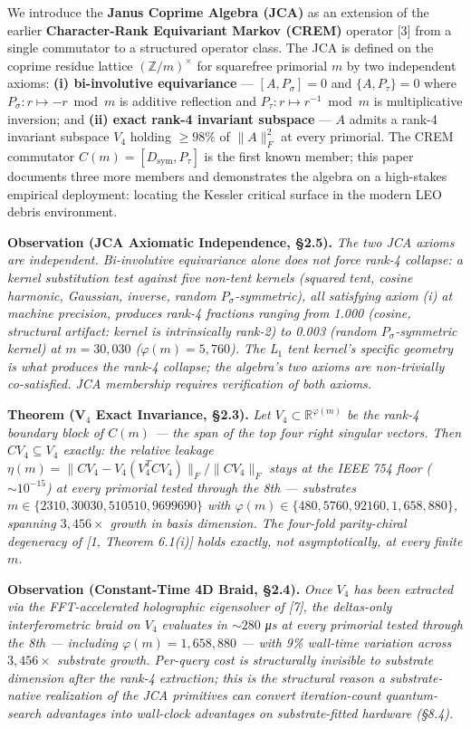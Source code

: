\documentclass[
]{article}
\begin{document}
We introduce the \textbf{Janus Coprime Algebra (JCA)} as an extension of
the earlier \textbf{Character-Rank Equivariant Markov (CREM)} operator
{[}3{]} from a single commutator to a structured operator class. The JCA
is defined on the coprime residue lattice \((\mathbb{Z}/m)^\times\) for
squarefree primorial \(m\) by two independent axioms: \textbf{(i)
bi-involutive equivariance} --- \([A, P_\sigma] = 0\) and
\(\{A, P_\tau\} = 0\) where \(P_\sigma : r \mapsto -r \bmod m\) is
additive reflection and \(P_\tau : r \mapsto r^{-1} \bmod m\) is
multiplicative inversion; and \textbf{(ii) exact rank-4 invariant
subspace} --- \(A\) admits a rank-4 invariant subspace \(V_4\) holding
\(\geq 98\%\) of \(\|A\|_F^2\) at every primorial. The CREM commutator
\(C(m) = [D_\text{sym}, P_\tau]\) is the first known member; this paper
documents three more members and demonstrates the algebra on a
high-stakes empirical deployment: locating the Kessler critical surface
in the modern LEO debris environment.

\textbf{Observation (JCA Axiomatic Independence, §2.5).} \emph{The two
JCA axioms are independent. Bi-involutive equivariance alone does not
force rank-4 collapse: a kernel substitution test against five non-tent
kernels (squared tent, cosine harmonic, Gaussian, inverse, random
\(P_\sigma\)-symmetric), all satisfying axiom (i) at machine precision,
produces rank-4 fractions ranging from 1.000 (cosine, structural
artifact: kernel is intrinsically rank-2) to 0.003 (random
\(P_\sigma\)-symmetric kernel) at \(m = 30{,}030\)
(\(\varphi(m) = 5{,}760\)). The L\(_1\) tent kernel's specific geometry
is what produces the rank-4 collapse; the algebra's two axioms are
non-trivially co-satisfied. JCA membership requires verification of both
axioms.}

\textbf{Theorem (V\(_4\) Exact Invariance, §2.3).} \emph{Let
\(V_4 \subset \mathbb{R}^{\varphi(m)}\) be the rank-4 boundary block of
\(C(m)\) --- the span of the top four right singular vectors. Then
\(CV_4 \subseteq V_4\) exactly: the relative leakage
\(\eta(m) = \|CV_4 - V_4(V_4^T C V_4)\|_F / \|CV_4\|_F\) stays at the
IEEE 754 floor (\(\sim 10^{-15}\)) at every primorial tested through the
8th --- substrates \(m \in \{2310, 30030, 510510, 9699690\}\) with
\(\varphi(m) \in \{480, 5760, 92160, 1{,}658{,}880\}\), spanning
\(3{,}456\times\) growth in basis dimension. The four-fold parity-chiral
degeneracy of {[}1, Theorem 6.1(i){]} holds exactly, not asymptotically,
at every finite \(m\).}

\textbf{Observation (Constant-Time 4D Braid, §2.4).} \emph{Once \(V_4\)
has been extracted via the FFT-accelerated holographic eigensolver of
{[}7{]}, the deltas-only interferometric braid on \(V_4\) evaluates in
\(\sim 280\) μs at every primorial tested through the 8th --- including
\(\varphi(m) = 1{,}658{,}880\) --- with 9\% wall-time variation across
\(3{,}456\times\) substrate growth. Per-query cost is structurally
invisible to substrate dimension after the rank-4 extraction; this is
the structural reason a substrate-native realization of the JCA
primitives can convert iteration-count quantum-search advantages into
wall-clock advantages on substrate-fitted hardware (§8.4).}
\end{document}
